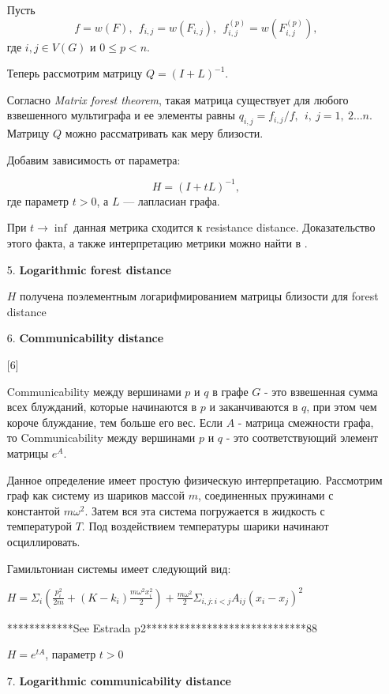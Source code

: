 \begin{itemize}
Пусть 
$$f = w(F),\ \  f_{i,j} = w(F_{i,j}),\ \  f_{i,j}^{(p)} = w(F_{i,j}^{(p)}),$$ 
где $i,j \in V(G)$ и $0 \le p < n$.

Теперь рассмотрим матрицу $Q = (I + L)^{-1}$.

Согласно \emph{Matrix forest theorem}, такая матрица существует для любого взвешенного мультиграфа и ее элементы равны $q_{i,j} = f_{i,j}/f,\ \ i,\ j = 1,\ 2\ldots n$. Матрицу $Q$ можно рассматривать как меру близости. 

Добавим зависимость от параметра:

\begin{equation}
H = (I + tL) ^{-1}, 
\end{equation} 
где параметр $t > 0$, а $L$ --- лапласиан графа.

При $t \to \inf$ данная метрика сходится к resistance distance. Доказательство этого факта, а также интерпретацию метрики можно найти в \cite{chebotarev2012walk}.

\item[5.] \textbf{Logarithmic forest distance}

$H$ получена поэлементным логарифмированием матрицы близости для forest distance

\item[6.] \textbf{Communicability distance}

[6]

Communicability между вершинами $p$ и $q$ в графе $G$ - это взвешенная сумма всех блужданий, которые начинаются в $p$ и заканчиваются в $q$, при этом чем короче блуждание, тем больше его вес. Если $A$ - матрица смежности графа, то Communicability между вершинами $p$ и $q$ - это соответствующий элемент матрицы $e^{A}$. 

Данное определение имеет простую физическую интерпретацию. Рассмотрим граф как систему из шариков массой $m$, соединенных пружинами с константой $m \omega ^2$. Затем вся эта система погружается в жидкость с температурой $T$. Под воздействием температуры шарики начинают осциллировать.

Гамильтониан системы имеет следующий вид:

$H = \Sigma _i (\frac{p_i^2}{2m} + (K-k_i)\frac{m\omega ^2 x_i^2}{2}) + \frac{m \omega ^2}{2} \Sigma _{i,j : i<j } A_{ij} (x_i-x_j)^2 $

************See Estrada p2*****************************88 

$H = e^{tA}$, параметр $t > 0$

\item[7.] \textbf{Logarithmic communicability distance}


\end{itemize}
